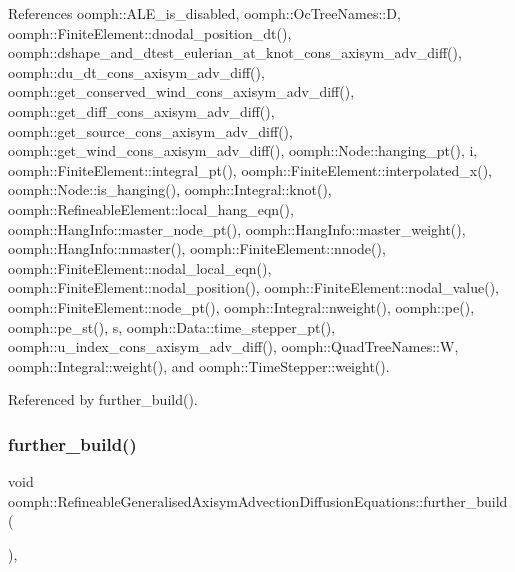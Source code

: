 References oomph\+::\+A\+L\+E\+\_\+is\+\_\+disabled, oomph\+::\+Oc\+Tree\+Names\+::D, oomph\+::\+Finite\+Element\+::dnodal\+\_\+position\+\_\+dt(), oomph\+::dshape\+\_\+and\+\_\+dtest\+\_\+eulerian\+\_\+at\+\_\+knot\+\_\+cons\+\_\+axisym\+\_\+adv\+\_\+diff(), oomph\+::du\+\_\+dt\+\_\+cons\+\_\+axisym\+\_\+adv\+\_\+diff(), oomph\+::get\+\_\+conserved\+\_\+wind\+\_\+cons\+\_\+axisym\+\_\+adv\+\_\+diff(), oomph\+::get\+\_\+diff\+\_\+cons\+\_\+axisym\+\_\+adv\+\_\+diff(), oomph\+::get\+\_\+source\+\_\+cons\+\_\+axisym\+\_\+adv\+\_\+diff(), oomph\+::get\+\_\+wind\+\_\+cons\+\_\+axisym\+\_\+adv\+\_\+diff(), oomph\+::\+Node\+::hanging\+\_\+pt(), i, oomph\+::\+Finite\+Element\+::integral\+\_\+pt(), oomph\+::\+Finite\+Element\+::interpolated\+\_\+x(), oomph\+::\+Node\+::is\+\_\+hanging(), oomph\+::\+Integral\+::knot(), oomph\+::\+Refineable\+Element\+::local\+\_\+hang\+\_\+eqn(), oomph\+::\+Hang\+Info\+::master\+\_\+node\+\_\+pt(), oomph\+::\+Hang\+Info\+::master\+\_\+weight(), oomph\+::\+Hang\+Info\+::nmaster(), oomph\+::\+Finite\+Element\+::nnode(), oomph\+::\+Finite\+Element\+::nodal\+\_\+local\+\_\+eqn(), oomph\+::\+Finite\+Element\+::nodal\+\_\+position(), oomph\+::\+Finite\+Element\+::nodal\+\_\+value(), oomph\+::\+Finite\+Element\+::node\+\_\+pt(), oomph\+::\+Integral\+::nweight(), oomph\+::pe(), oomph\+::pe\+\_\+st(), s, oomph\+::\+Data\+::time\+\_\+stepper\+\_\+pt(), oomph\+::u\+\_\+index\+\_\+cons\+\_\+axisym\+\_\+adv\+\_\+diff(), oomph\+::\+Quad\+Tree\+Names\+::W, oomph\+::\+Integral\+::weight(), and oomph\+::\+Time\+Stepper\+::weight().



Referenced by further\+\_\+build().

\mbox{\label{classoomph_1_1RefineableGeneralisedAxisymAdvectionDiffusionEquations_a7a664e8931def11ab00e8f15140f2df2}} 
\subsubsection{\texorpdfstring{further\+\_\+build()}{further\_build()}}
{\footnotesize\ttfamily void oomph\+::\+Refineable\+Generalised\+Axisym\+Advection\+Diffusion\+Equations\+::further\+\_\+build (\begin{DoxyParamCaption}{ }\end{DoxyParamCaption})\hspace{0.3cm}{\ttfamily [inline]}, {\ttfamily [virtual]}}



